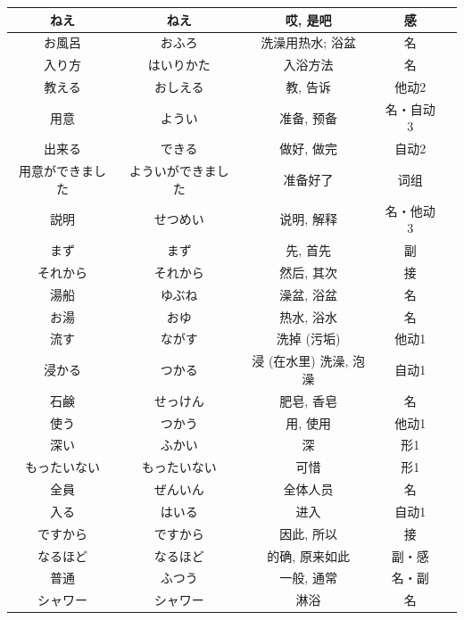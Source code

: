 \begin{longtable}{|c|c|c|c|c|}
ねえ & ねえ &  哎, 是吧 & 感 & \\ \hline
お風呂 & おふろ & 洗澡用热水; 浴盆 & 名 & \\ \hline
入り方 & はいりかた & 入浴方法 & 名 & \\ \hline
教える & おしえる & 教, 告诉 & 他动2 & \\ \hline
用意 & ようい & 准备, 预备 & 名・自动3 & \\ \hline
出来る & できる & 做好, 做完 & 自动2 & \\ \hline
用意ができました & よういができました & 准备好了 & 词组 & \\ \hline
説明 & せつめい & 说明, 解释 & 名・他动3 & \\ \hline
まず & まず & 先, 首先 & 副 & \\ \hline
それから & それから & 然后, 其次 & 接 & \\ \hline
湯船 & ゆぶね & 澡盆, 浴盆 & 名 & \\ \hline
お湯 & おゆ & 热水, 浴水 & 名 & \\ \hline
流す & ながす & 洗掉 (污垢) & 他动1 & \\ \hline
浸かる & つかる & 浸 (在水里) 洗澡, 泡澡 & 自动1 & \\ \hline
石鹸 & せっけん & 肥皂, 香皂 & 名 & \\ \hline
使う & つかう & 用, 使用 & 他动1 & \\ \hline
深い & ふかい & 深 & 形1 & \\ \hline
もったいない & もったいない & 可惜 & 形1 & \\ \hline
全員 & ぜんいん & 全体人员 & 名 & \\ \hline
入る & はいる & 进入 & 自动1 & \\ \hline
ですから & ですから & 因此, 所以 & 接 & \\ \hline
なるほど & なるほど & 的确, 原来如此 & 副・感 & \\ \hline
普通 & ふつう & 一般, 通常 & 名・副 & \\ \hline
シャワー & シャワー & 淋浴 & 名 & \\ \hline
\end{longtable}
